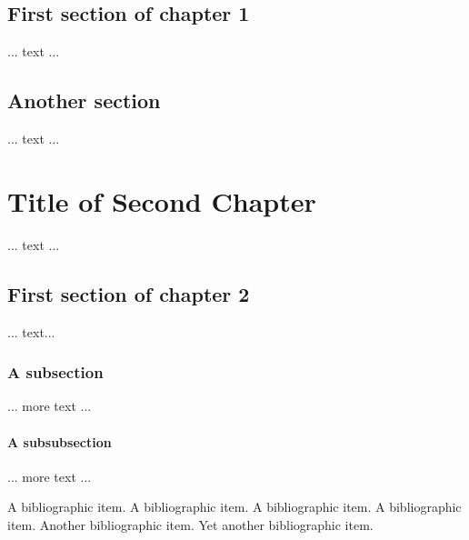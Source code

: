 \documentclass[12pt]{nuthesis}	%
\begin{document}
\section{First section of chapter 1}
	... text ...		%
\section{Another section}	%
	... text ...		%

\chapter{Title of Second Chapter}	%

	... text ...

\section{First section of chapter 2}

	... text...

\subsection{A subsection}

	... more text ...

\subsubsection{A subsubsection}

	... more text ...



%

%


%
\begin{singlespace}
\clearpage{} %
\begin{thebibliography}{xxx}

 A bibliographic item.  A bibliographic item.  A
bibliographic item.  A bibliographic item.
 Another bibliographic item.  
 Yet another bibliographic item.  
\end{thebibliography}
\end{singlespace}
\end{document}
